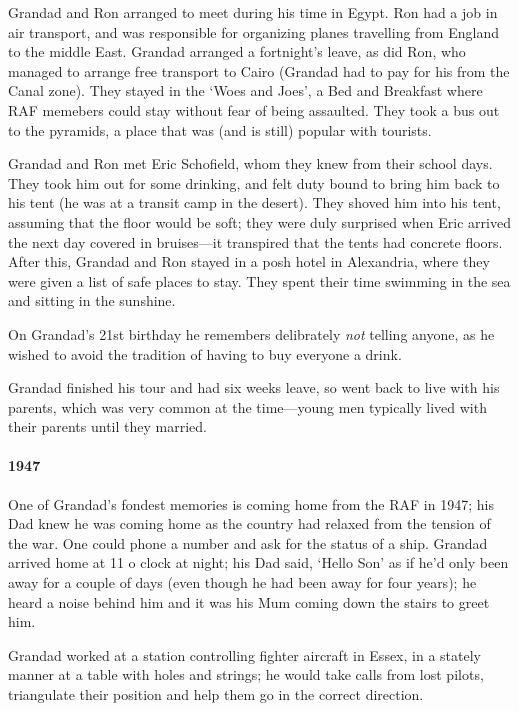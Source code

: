 \documentclass[11pt]{article}
\begin{document}
Grandad and Ron arranged to meet during his time in Egypt. Ron had a job 
in air transport, and was responsible for organizing planes travelling from England 
to the middle East. Grandad arranged a fortnight's leave, as did Ron, who 
managed to arrange free transport to Cairo (Grandad had to pay for his from 
the Canal zone). They stayed in the `Woes and Joes', a Bed and Breakfast where RAF memebers 
could stay without fear of being assaulted. They took a bus out to the pyramids, a place 
that was (and is still) popular with tourists.

Grandad and Ron met Eric Schofield, whom they knew from their school days. They
took him out for some drinking, and felt duty bound to bring him back to his tent (he was 
at a transit camp in the desert). They shoved him into his tent, assuming that 
the floor would be soft; they were duly surprised when Eric arrived the next day 
covered in bruises---it transpired that the tents had concrete floors. After this, 
Grandad and Ron stayed in a posh hotel in Alexandria, where they were given 
a list of safe places to stay. They spent their time swimming in the sea 
and sitting in the sunshine.

On Grandad's 21st birthday he remembers delibrately \emph{not} telling anyone, as 
he wished to avoid the tradition of having to buy everyone a drink.

  Grandad finished his tour and had six weeks leave, so went back to live with his parents, which was 
  very common at the time---young men typically lived with their parents until they married. 

  \paragraph{1947} One of Grandad's fondest memories is coming home from the RAF in 1947; his Dad knew 
he was coming home  as the country had relaxed from the tension of the war. 
One could phone a number and ask for the status of a ship. Grandad arrived home at 
11 o clock at night; his Dad said, `Hello Son' as if he'd only been away for 
a couple of days (even though he had been away for four years); he heard a noise 
behind him and it was his Mum coming down the stairs to greet him.

  Grandad worked at a station controlling fighter aircraft in Essex, in a stately manner at a table 
  with holes and strings; he would take calls from lost pilots, triangulate their position
  and help them go in the correct direction. 
\end{document}
